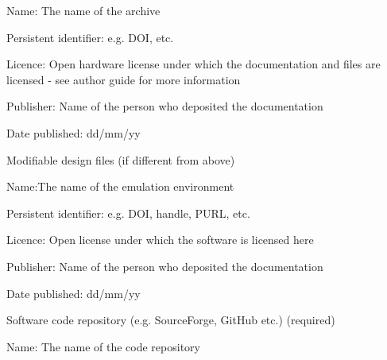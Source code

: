 \documentclass[a4paper]{article}
\begin{document}
Name: The name of the archive

Persistent identifier: e.g. DOI, etc.

Licence: Open hardware license under which the documentation and
files are licensed - see author guide for more information

Publisher: Name of the person who deposited the documentation

Date published: dd/mm/yy

Modifiable design files (if different from above)

Name:The name of the emulation environment

Persistent identifier: e.g. DOI, handle, PURL, etc.

Licence: Open license under which the software is licensed here

Publisher: Name of the person who deposited the documentation

Date published: dd/mm/yy

Software code repository (e.g. SourceForge, GitHub etc.)
(required)

Name: The name of the code repository
\end{document}
